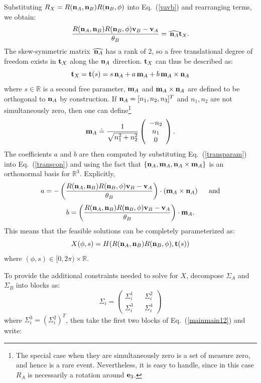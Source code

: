\documentclass[twocolumn,10pt]{asme2ej}
\newcommand{\IR}{\mathbb{R}}
\begin{document}
Substituting $R_X = R({\bf n}_A, {\bf n}_B) R({\bf n}_B, \phi)$ into Eq.~(\ref{vavb}) and rearranging terms, we obtain:
\begin{equation}
\frac{R({\bf n}_A, {\bf n}_B) R({\bf n}_B, \phi) {\bf v}_B - {\bf v}_A}{\theta_B} = \widehat{\, {\bf n}_A} {\bf t}_X.
\label{transcon} \end{equation}
The skew-symmetric matrix $\widehat{\, {\bf n}_A}$ has a rank of 2, so a free translational degree of freedom exists in ${\bf t}_X$ along the ${\bf n}_A$ direction. ${\bf t}_X$ can thus be described as:
\begin{equation}
{\bf t}_X =  {\bf t}(s) = s \, {\bf n}_A + a \, {\bf m}_A + b \, {\bf m}_A \times {\bf n}_A
\label{transparam} \end{equation}
where $s \in \mathbb{R}$ is a second free parameter, ${\bf m}_A$ and ${\bf m}_A \times {\bf n}_A$ are
defined to be orthogonal to ${\bf n}_A$ by construction. If
${\bf n}_A  = [n_1, n_2, n_3]^T$ and $n_1, n_2$ are not simultaneously zero, then one can define\footnote{The special case when they are simultaneously zero
is a set of measure zero, and hence is a rare event. Nevertheless, it is easy to handle, since in this case $R_A$ is necessarily a rotation around ${\bf e}_3$.}
$$ {\bf m}_A \doteq \frac{1}{\sqrt{n_1^2 + n_2^2}} \left(\begin{array}{c}
-n_2 \\
n_1 \\
0 \end{array}\right).
$$
The coefficients $a$ and $b$ are then computed by substituting Eq.~(\ref{transparam}) into Eq.~(\ref{transcon}) and using the fact that
$\{{\bf n}_A, {\bf m}_A, {\bf n}_A \times {\bf m}_A\}$ is an orthonormal basis for $\mathbb{R}^3$. Explicitly,
$$ a = - \left(\frac{R({\bf n}_A, {\bf n}_B) R({\bf n}_B, \phi) {\bf v}_B - {\bf v}_A}{\theta_B}\right) \cdot \left({\bf m}_A \times {\bf n}_A\right) \hspace{5mm}\mbox{and}$$
$$ b =\left(\frac{R({\bf n}_A, {\bf n}_B) R({\bf n}_B, \phi) {\bf v}_B - {\bf v}_A}{\theta_B}\right)\cdot {\bf m}_A . $$
This means that the feasible solutions can be completely parameterized as:
\begin{equation}
X(\phi,s) = H(R({\bf n}_A, {\bf n}_B) R({\bf n}_B, \phi), {\bf t}(s))
\label{cylinder} \end{equation}
where $(\phi, s) \in [0,2\pi) \times \IR$.


To provide the additional constraints needed to solve for $X$, decompose $\Sigma_{A}$ and $\Sigma_{B}$ into blocks as:
$$ \Sigma_{i}= \left(\begin{array}{ccc}
\Sigma_{i}^1 && \Sigma_{i}^2 \\
\Sigma_{i}^3 && \Sigma_{i}^4  \end{array}\right)
$$
where $\Sigma_{i}^3 = (\Sigma_{i}^2)^T$, then take the first two blocks of Eq.~(\ref{mainmain12}) and write:
\end{document}
